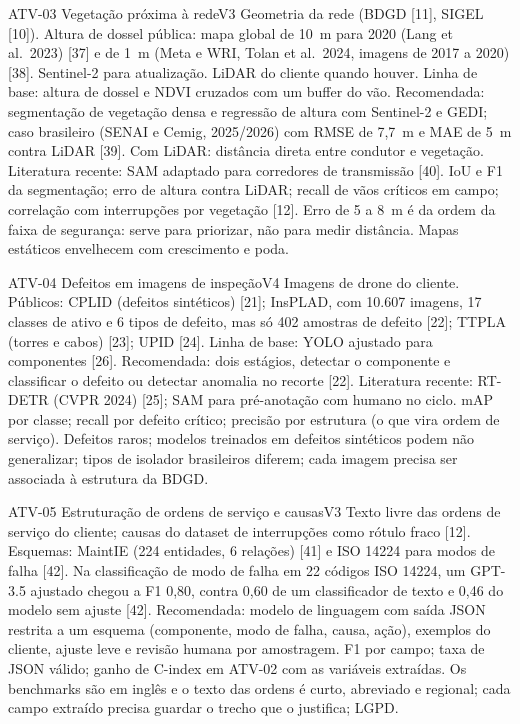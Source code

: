 \begin{ficha}{ATV-03 \textperiodcentered{} Vegetação próxima à rede}{V3}
 Geometria da rede (BDGD [11], SIGEL [10]). Altura de dossel
pública: mapa global de 10~m para 2020 (Lang et al.\ 2023) [37] e de 1~m
(Meta e WRI, Tolan et al.\ 2024, imagens de 2017 a 2020) [38]. Sentinel-2
para atualização. LiDAR do cliente quando houver.
 Linha de base: altura de dossel e NDVI cruzados com um
buffer do vão. Recomendada: segmentação de vegetação densa e regressão de
altura com Sentinel-2 e GEDI; caso brasileiro (SENAI e Cemig, 2025/2026) com
RMSE de 7,7~m e MAE de 5~m contra LiDAR [39]. Com LiDAR: distância direta
entre condutor e vegetação. Literatura recente: SAM adaptado para corredores de
transmissão [40].
 IoU e F1 da segmentação; erro de altura contra LiDAR; recall
de vãos críticos em campo; correlação com interrupções por vegetação [12].
 Erro de 5 a 8~m é da ordem da faixa de segurança: serve
para priorizar, não para medir distância. Mapas estáticos envelhecem com
crescimento e poda.
\end{ficha}

\begin{ficha}{ATV-04 \textperiodcentered{} Defeitos em imagens de inspeção}{V4}
 Imagens de drone do cliente. Públicos: CPLID (defeitos
sintéticos) [21]; InsPLAD, com 10.607 imagens, 17 classes de ativo e 6 tipos
de defeito, mas só 402 amostras de defeito [22]; TTPLA (torres e cabos) [23];
UPID [24].
 Linha de base: YOLO ajustado para componentes [26].
Recomendada: dois estágios, detectar o componente e classificar o defeito ou
detectar anomalia no recorte [22]. Literatura recente: RT-DETR (CVPR 2024) [25];
SAM para pré-anotação com humano no ciclo.
 mAP por classe; recall por defeito crítico; precisão por
estrutura (o que vira ordem de serviço).
 Defeitos raros; modelos treinados em defeitos sintéticos
podem não generalizar; tipos de
isolador brasileiros diferem; cada imagem precisa ser associada à estrutura
da BDGD.
\end{ficha}

\begin{ficha}{ATV-05 \textperiodcentered{} Estruturação de ordens de serviço e causas}{V3}
 Texto livre das ordens de serviço do cliente; causas do dataset
de interrupções como rótulo fraco [12]. Esquemas: MaintIE (224 entidades, 6
relações) [41] e ISO 14224 para modos de falha [42].
 Na classificação de modo de falha em 22 códigos ISO 14224,
um GPT-3.5 ajustado chegou a F1 0,80, contra 0,60 de um classificador de
texto e 0,46 do modelo sem ajuste [42]. Recomendada: modelo de linguagem com
saída JSON restrita a um esquema (componente, modo de falha, causa, ação),
exemplos do cliente, ajuste leve e revisão humana por amostragem.
 F1 por campo; taxa de JSON válido; ganho de C-index em ATV-02
com as variáveis extraídas.
 Os benchmarks são em inglês e o texto das ordens é curto,
abreviado e regional; cada campo extraído precisa guardar o trecho que o
justifica; LGPD.
\end{ficha}

